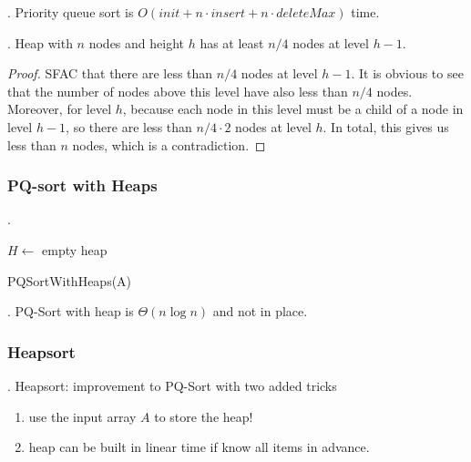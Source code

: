 \documentclass{article}
\begin{document}
\begin{comm}[].
    Priority queue sort is $O (init + n \cdot insert + n \cdot deleteMax)$ time. 
\end{comm}

\begin{thmm}[].
    Heap with $n$ nodes and height $h$ has at least $n/4$ nodes at level $h-1$. 
    \label{thm2.2}
\end{thmm}

\begin{proof}
    SFAC that there are less than $n/4$ nodes at level $h-1$. It is obvious to see that the number of nodes above this level have also less than $n/4$ nodes. Moreover, for level $h$, because each node in this level must be a child of a node in level $h-1$, so there are less than $n/4 \cdot 2$ nodes at level $h$. In total, this gives us less than $n$ nodes, which is a contradiction. 
\end{proof}

\subsubsection{PQ-sort with Heaps}

\begin{algo}[].
    \begin{algorithm}[H] 
        $H \leftarrow$ empty heap \\ 
         
        \caption{PQSortWithHeaps(A)}
    \end{algorithm}
\end{algo}

\begin{discovery}[].
    PQ-Sort with heap is $\Theta(n \log{n})$ and not in place. 
\end{discovery}

\subsubsection{Heapsort}

\begin{result}[].
    Heapsort: improvement to PQ-Sort with two added tricks \begin{enumerate}
        \item use the input array $A$ to store the heap! 
        \item heap can be built in linear time if know all items in advance. 
    \end{enumerate} 
\end{result}
\end{document}
